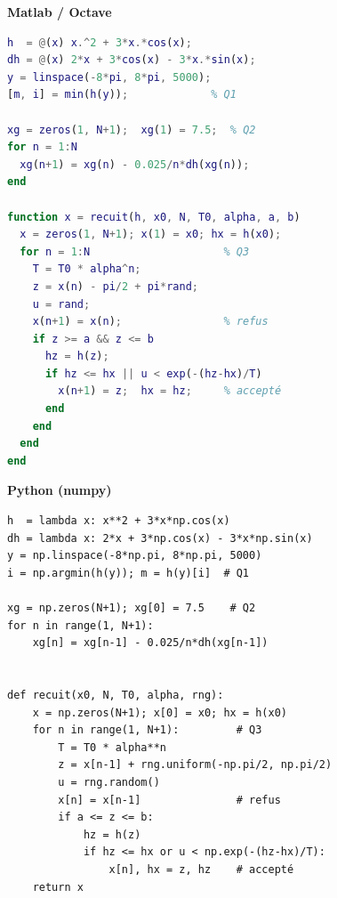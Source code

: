 \documentclass[11pt,a4paper]{article}
\begin{document}
\noindent
\begin{minipage}[t]{0.495\linewidth}
{\small\bfseries\color{violet8}Matlab / Octave}
\begin{lstlisting}[language=Matlab,style=petit]
h  = @(x) x.^2 + 3*x.*cos(x);
dh = @(x) 2*x + 3*cos(x) - 3*x.*sin(x);
y = linspace(-8*pi, 8*pi, 5000);
[m, i] = min(h(y));             % Q1

xg = zeros(1, N+1);  xg(1) = 7.5;  % Q2
for n = 1:N
  xg(n+1) = xg(n) - 0.025/n*dh(xg(n));
end

function x = recuit(h, x0, N, T0, alpha, a, b)
  x = zeros(1, N+1); x(1) = x0; hx = h(x0);
  for n = 1:N                     % Q3
    T = T0 * alpha^n;
    z = x(n) - pi/2 + pi*rand;
    u = rand;
    x(n+1) = x(n);                % refus
    if z >= a && z <= b
      hz = h(z);
      if hz <= hx || u < exp(-(hz-hx)/T)
        x(n+1) = z;  hx = hz;     % accepté
      end
    end
  end
end
\end{lstlisting}
\end{minipage}\hfill
\begin{minipage}[t]{0.495\linewidth}
{\small\bfseries\color{violet8}Python (numpy)}
\begin{lstlisting}[style=petit]
h  = lambda x: x**2 + 3*x*np.cos(x)
dh = lambda x: 2*x + 3*np.cos(x) - 3*x*np.sin(x)
y = np.linspace(-8*np.pi, 8*np.pi, 5000)
i = np.argmin(h(y)); m = h(y)[i]  # Q1

xg = np.zeros(N+1); xg[0] = 7.5    # Q2
for n in range(1, N+1):
    xg[n] = xg[n-1] - 0.025/n*dh(xg[n-1])


def recuit(x0, N, T0, alpha, rng):
    x = np.zeros(N+1); x[0] = x0; hx = h(x0)
    for n in range(1, N+1):         # Q3
        T = T0 * alpha**n
        z = x[n-1] + rng.uniform(-np.pi/2, np.pi/2)
        u = rng.random()
        x[n] = x[n-1]               # refus
        if a <= z <= b:
            hz = h(z)
            if hz <= hx or u < np.exp(-(hz-hx)/T):
                x[n], hx = z, hz    # accepté
    return x
\end{lstlisting}
\end{minipage}
\end{document}
